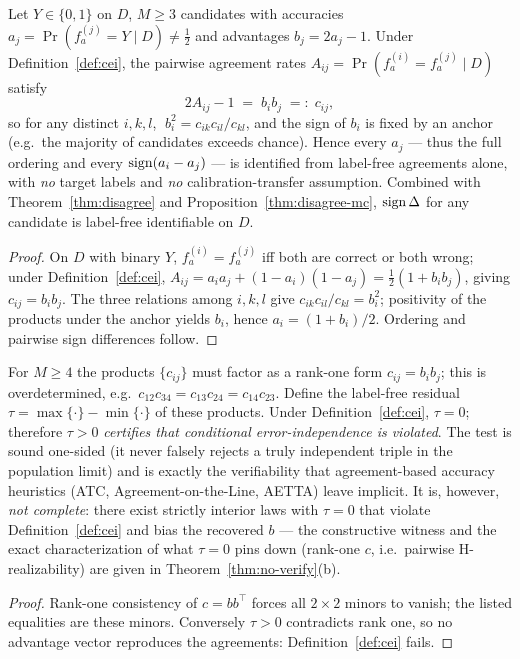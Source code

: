 \begin{proposition}\label{thm:multicand}
Let $Y\in\{0,1\}$ on $D$, $M\ge3$ candidates with accuracies $a_j=\Pr(f_a^{(j)}{=}Y\mid D)\neq\tfrac12$
and advantages $b_j=2a_j-1$. Under Definition~\ref{def:cei}, the pairwise agreement rates
$A_{ij}=\Pr(f_a^{(i)}{=}f_a^{(j)}\mid D)$ satisfy
\[
2A_{ij}-1 \;=\; b_i b_j \;=:\; c_{ij},
\]
so for any distinct $i,k,l$, $\;b_i^2=c_{ik}c_{il}/c_{kl}$, and the sign of $b_i$ is fixed
by an anchor (e.g.\ the majority of candidates exceeds chance). Hence every $a_j$ --- thus
the full ordering and every $\operatorname{sign}(a_i-a_j)$ --- is identified from label-free agreements
alone, with \emph{no} target labels and \emph{no} calibration-transfer assumption.
Combined with Theorem~\ref{thm:disagree} and Proposition~\ref{thm:disagree-mc}, $\operatorname{sign}\Delta$ for any
candidate is label-free identifiable on $D$.
\end{proposition}
\begin{proof}
On $D$ with binary $Y$, $f_a^{(i)}{=}f_a^{(j)}$ iff both are correct or both wrong; under
Definition~\ref{def:cei},
$A_{ij}=a_ia_j+(1-a_i)(1-a_j)=\tfrac12(1+b_ib_j)$, giving $c_{ij}=b_ib_j$. The three
relations among $i,k,l$ give $c_{ik}c_{il}/c_{kl}=b_i^2$; positivity of the products under
the anchor yields $b_i$, hence $a_i=(1+b_i)/2$. Ordering and pairwise sign differences
follow.
\end{proof}

\begin{proposition}\label{prop:cei-test}
For $M\ge4$ the products $\{c_{ij}\}$ must factor as a rank-one form $c_{ij}=b_ib_j$;
this is overdetermined, e.g.\ $c_{12}c_{34}=c_{13}c_{24}=c_{14}c_{23}$. Define the
label-free residual $\tau=\max\{\cdot\}-\min\{\cdot\}$ of these products. Under
Definition~\ref{def:cei}, $\tau=0$; therefore $\tau>0$ \emph{certifies that conditional
error-independence is violated}. The test is sound one-sided (it never falsely rejects a
truly independent triple in the population limit) and is exactly the verifiability that
agreement-based accuracy heuristics (ATC, Agreement-on-the-Line, AETTA) leave implicit.
It is, however, \emph{not complete}: there exist strictly interior laws with $\tau=0$
that violate Definition~\ref{def:cei} and bias the recovered $b$ --- the constructive
witness and the exact characterization of what $\tau=0$ pins down (rank-one $c$, i.e.\
pairwise H-realizability) are given in Theorem~\ref{thm:no-verify}(b).
\end{proposition}
\begin{proof}
Rank-one consistency of $c=bb^\top$ forces all $2\times2$ minors to vanish; the listed
equalities are these minors. Conversely $\tau>0$ contradicts rank one, so no advantage
vector reproduces the agreements: Definition~\ref{def:cei} fails.
\end{proof}

